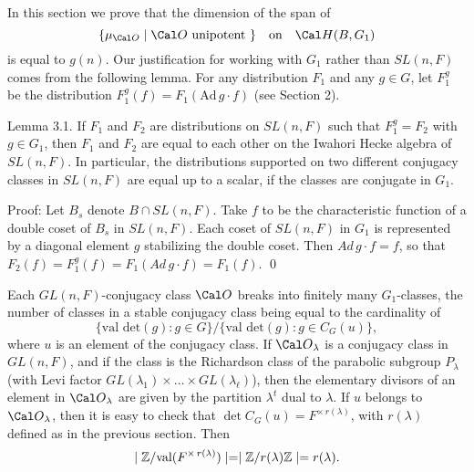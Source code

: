 \newpage\noindent
{}

\medskip
\noindent
In this section we prove that the dimension of the span of
%
$$
  \{ \mu_{\Cal O} \mid
     {\Cal O} \text{ unipotent } \} 
  \quad \text{on} \quad
  {\Cal H} (B, G_1)
$$
%
is equal to 
  $ g(n) $.  Our justification for working with $G_1$ rather
  than $SL(n,F)$ comes from the following lemma.
  For any distribution $F_1$ and any $g\in G$, let $F^g_1$ be the distribution
  $F^g_1(f) = F_1(\text{Ad}\,g\cdot f)$ (see Section 2).

\proclaim Lemma {3.1}.
If
  $ {F}_1$ and ${F}_2 $
are distributions on 
  $ SL(n,F) $
such that
  $ {F}_1^g = 
    {F}_2 $
with $g\in G_1$, then
  $ F_1$ and $F_2$ 
are equal to each other on
the Iwahori Hecke algebra of $SL(n,F)$.
In particular, the distributions supported on two different conjugacy
classes in $SL(n,F)$ are equal up to a scalar, if the classes are
conjugate in $G_1$.
\finishproclaim

\pproclaim Proof:
Let $B_s$ denote $B\cap SL(n,F)$.
Take
  $f$ to be the characteristic function of 
  a double coset of $B_s$ in $SL(n,F)$.
  Each coset of $SL(n,F)$ in $G_1$ is represented by a diagonal element
  $g$ stabilizing the double coset.
Then
  $ Ad \, g \cdot f = f $,
so that
  $ F_2 (f) =
    F_1^g (f) =
    F_1 (Ad \, g \cdot f) =
    F_1 (f) $.
\qed
\finishpproclaim

Each $GL(n,F)$-conjugacy class
  $ {\Cal O} $
breaks into finitely many 
  $ G_1 $-classes, the
  number of classes in a stable conjugacy class
  being equal to the cardinality of
%
$$
  \bigl\{
    \text{val det}(g):
    g \in G
  \bigr\}
  \big/
  \bigl\{
    \text{val det}(g):
    g \in C_{G} (u)
  \bigr\},
$$
%
where $u$ is an element of the conjugacy class.
If 
  $ {\Cal O}_{\lambda} $
is a conjugacy class in $GL(n,F)$, and if the class is 
the Richardson class of the
  parabolic subgroup 
  $ P_{\lambda} $
(with Levi factor
  $ GL (\lambda_1) \times \dots \times GL(\lambda_{\ell}) $),
then the elementary divisors of an element in
  $ {\Cal O}_{\lambda} $
are given by the partition $\lambda^t$ dual to $\lambda$.  
If $u$ belongs to ${\Cal O}_\lambda$, then it is easy to check that
  $ \det C_G (u) = F^{\times\,r(\lambda)} $,
with
  $ r(\lambda) $
defined as in the previous section.
Then
%
$$
  \mid 
      {\Bbb Z} / \text{val}(F^{\times\,r(\lambda)})
     \mid =
  \mid 
      {\Bbb Z} / r(\lambda) {\Bbb Z}
      \mid
     = r(\lambda) .
$$
%

